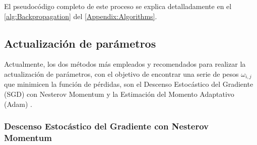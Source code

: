 El pseudocódigo completo de este proceso se explica detalladamente en el \autoref{alg:Backpropagation} del \autoref{Appendix:Algorithms}.

\subsection{Actualización de parámetros} \label{Chapter:Optimizers}

Actualmente, los dos métodos más empleados y recomendados para realizar la actualización de parámetros, con el objetivo de encontrar una serie de pesos $\omega_{i,j}$ que minimicen la función de pérdidas, son el Descenso Estocástico del Gradiente (SGD) con Nesterov Momentum y la Estimación del Momento Adaptativo (Adam) \cite{CS231n}.

\subsubsection{Descenso Estocástico del Gradiente con Nesterov Momentum} \label{Chapter:SGD}

